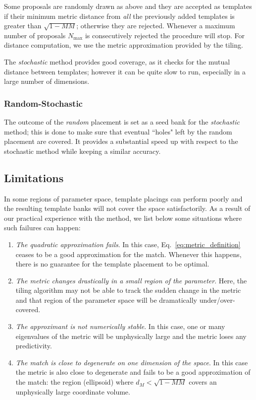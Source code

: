 \documentclass[twocolumn,showpacs,preprintnumbers,nofootinbib,prd,
superscriptaddress,10pt]{revtex4-2}
\begin{document}
Some proposals are randomly drawn as above and they are accepted as templates if their minimum metric distance from {\it all} the previously added templates is greater than  $\sqrt{1-MM}$; otherwise they are rejected.
Whenever a maximum number of proposals $N_\text{max}$ is consecutively rejected the procedure will stop. For distance computation, we use the metric approximation provided by the tiling.

The {\it stochastic} method provides good coverage, as it checks for the mutual distance between templates; however it can be quite slow to run, especially in a large number of dimensions.

\subsubsection{Random-Stochastic}\label{par:randomstochastic}
The outcome of the {\it random} placement is set as a seed bank for the {\it stochastic} method; this is done to make sure that eventual ``holes" left by the random placement are covered. It provides a substantial speed up with respect to the stochastic method while keeping a similar accuracy.

\subsection{Limitations} \label{sec:limitations}

In some regions of parameter space, template placings can perform poorly and the resulting template banks will not cover the space satisfactorily.
As a result of our practical experience with the method, we list below some situations where such failures can happen:

\begin{enumerate}
	\item {\it The quadratic approximation fails}. In this case, Eq.~\eqref{eq:metric_definition} ceases to be a good approximation for the match. Whenever this happens, there is no guarantee for the template placement to be optimal.
	\item {\it The metric changes drastically in a small region of the parameter}. Here, the tiling algorithm may not be able to track the sudden change in the metric and that region of the parameter space will be dramatically under/over-covered.
	\item {\it The approximant is not numerically stable}. In this case, one or many eigenvalues of the metric will be unphysically large and the metric loses any predictivity.
	\item {\it The match is close to degenerate on one dimension of the space}. In this case the metric is also close to degenerate and fails to be a good approximation of the match: the region (ellipsoid) where $d_M<\sqrt{1-MM}$ covers an unphysically large coordinate volume.
\end{enumerate}
\end{document}
